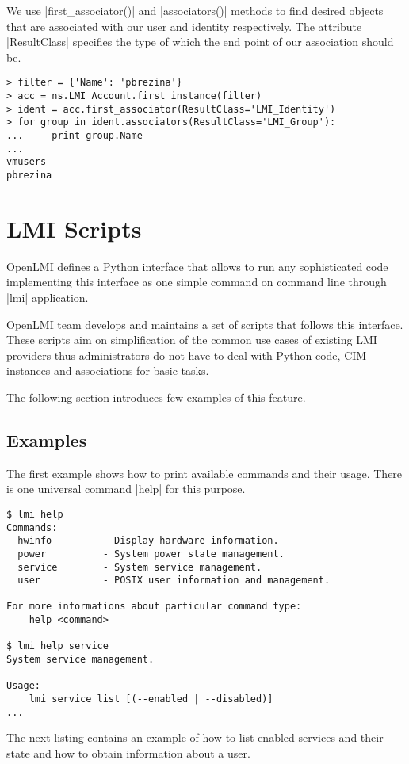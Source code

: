 We use |first_associator()| and |associators()| methods to find desired objects
that are associated with our user and identity respectively. The attribute
|ResultClass| specifies the type of which the end point of our association
should be.

\begin{lstlisting}[]
> filter = {'Name': 'pbrezina'}
> acc = ns.LMI_Account.first_instance(filter)
> ident = acc.first_associator(ResultClass='LMI_Identity')
> for group in ident.associators(ResultClass='LMI_Group'):
...     print group.Name
... 
vmusers
pbrezina
\end{lstlisting}

\section{LMI Scripts}
\label{openlmi:scripts}

OpenLMI defines a Python interface that allows to run any sophisticated code
implementing this interface as one simple command on command line through |lmi|
application.

OpenLMI team develops and maintains a set of scripts that follows this
interface. These scripts aim on simplification of the common use cases of
existing LMI providers thus administrators do not have to deal with Python code,
CIM instances and associations for basic tasks.

The following section introduces few examples of this feature.

\subsection{Examples}
\label{openlmi:scripts:examples}

The first example shows how to print available commands and their usage. There
is one universal command |help| for this purpose.

\begin{lstlisting}[]
$ lmi help
Commands:
  hwinfo         - Display hardware information.
  power          - System power state management.
  service        - System service management.
  user           - POSIX user information and management.

For more informations about particular command type:
    help <command>

$ lmi help service
System service management.

Usage:
    lmi service list [(--enabled | --disabled)]
...
\end{lstlisting}
\funclistend
The next listing contains an example of how to list enabled services and
their state and how to obtain information about a user.

